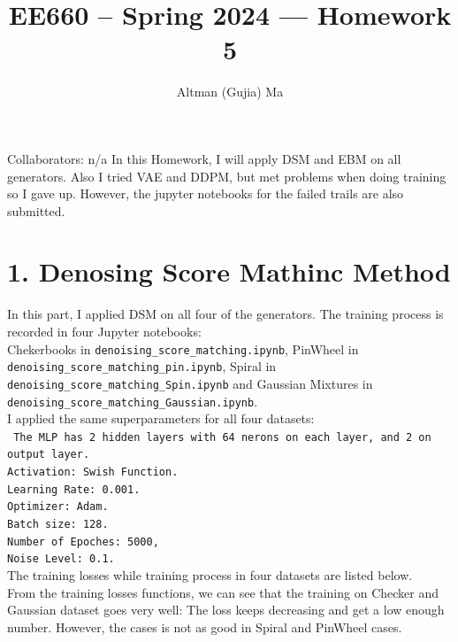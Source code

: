 \documentclass[11pt]{article}
\title{EE660 -- Spring 2024 --- Homework 5}
\author{Altman (Gujia) Ma}
\date{}
\begin{document}
	\maketitle
	
	Collaborators: n/a
	In this Homework, I will apply DSM and EBM on all generators. Also I tried VAE and DDPM, but met problems when doing training so I gave up. However, the jupyter notebooks for the failed trails are also submitted. 
	\section*{1. Denosing Score Mathinc Method}
	In this part, I applied DSM on all four of the generators. 
	The training process is recorded in four Jupyter notebooks:\\ Chekerbooks in \texttt{denoising\_score\_matching.ipynb}, PinWheel in \texttt{denoising\_score\_matching\_pin.ipynb}, Spiral in \texttt{denoising\_score\_matching\_Spin.ipynb} and Gaussian Mixtures in\\ \texttt{denoising\_score\_matching\_Gaussian.ipynb}. \\
	I applied the same superparameters for all four datasets:\\\texttt{
	The MLP has 2 hidden layers with 64 nerons on each layer, and 2 on output layer. \\
	Activation: Swish Function.\\
	Learning Rate: 0.001.\\
	Optimizer: Adam.\\
	Batch size: 128.\\
	Number of Epoches: 5000,\\
	Noise Level: 0.1.\\}
	The training losses while training process in four datasets are listed below.\\
	From the training losses functions, we can see that the training on Checker and Gaussian dataset goes very well: The loss keeps decreasing and get a low enough number. However, the cases is not as good in Spiral and PinWheel cases.
\end{document}
